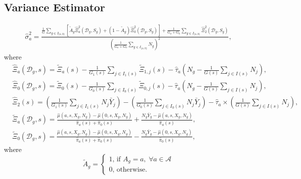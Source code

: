 \documentclass{article}
\begin{document}
\subsection*{Variance Estimator}
\begin{align}
	\hat{\sigma}_a^2 = \frac{\frac{1}{G} \sum_{g \in I_{\{a,0\}}}\left[\tilde{A}_g\hat{\Xi}_{a}^2(\mathcal D_g, S_g) + (1-\tilde{A}_g) \hat{\Xi}_{0}^2(\mathcal D_g, S_g)\right] + \frac{1}{G_a + G_0} \sum_{g \in I_{\{a,0\}}}\hat{\Xi}_2^2(\mathcal D_g, S_g)}{\left(\frac{1}{G_a + G_0}\sum_{g \in I_{\{a,0\}}} N_g\right)^2}, \nonumber
\end{align}
where 
\begin{align}
	&\hat{\Xi}_{a}(\mathcal D_g, s) = \tilde{\Xi}_{a}(s) - \frac{1}{G_1(s)} \sum_{j \in I_1(s)} \tilde{\Xi}_{1,j}(s)  - \hat{\tau}_a \left(N_g - \frac{1}{G(s)} \sum_{j \in I(s)} N_j \right)\nonumber, \\
	&\hat{\Xi}_{0}(\mathcal D_g, s) = \tilde{\Xi}_{0}(s) - \frac{1}{G_0(s)} \sum_{j \in I_0(s)} \tilde{\Xi}_{0,j}(s)  - \hat{\tau}_a \left(N_g - \frac{1}{G(s)} \sum_{j \in I(s)} N_j \right)\nonumber , \\
	& \hat{\Xi}_2(s) = \left(\frac{1}{G_1(s)} \sum_{j \in I_1(s)} N_j \bar{Y}_j\right) - \left(\frac{1}{G_0(s)} \sum_{j \in I_0(s)} N_j \bar{Y}_j\right) - \hat{\tau}_a \times \left(\frac{1}{G(s)}\sum_{j \in I(s)} N_j \right), \nonumber \\
	&\tilde{\Xi}_{a}(\mathcal D_g, s) =\frac{\hat{\mu}(a,s,X_g,N_g) - \hat{\mu}(0,s,X_g,N_g)}{\hat{\pi}_a(s) + \hat{\pi}_0(s)} + \frac{N_g \bar{Y}_g - \hat{\mu}(a,s,X_g,N_g)}{\hat{\pi}_a(s)}, \nonumber \\
	& \tilde{\Xi}_{0}(\mathcal D_g, s) =\frac{\hat{\mu}(a,s,X_g,N_g) - \hat{\mu}(0,s,X_g,N_g)}{\hat{\pi}_a(s) + \hat{\pi}_0(s)} - \frac{N_g \bar{Y}_g - \hat{\mu}(0,s,X_g,N_g)}{\hat{\pi}_0(s)}, \nonumber
	\end{align}
	where 
\[\tilde{A}_g = \begin{cases}1\text{, if }A_g = a,\; \forall a \in \mathcal A \\ 0\text{, otherwise.}\end{cases}\]
\end{document}
